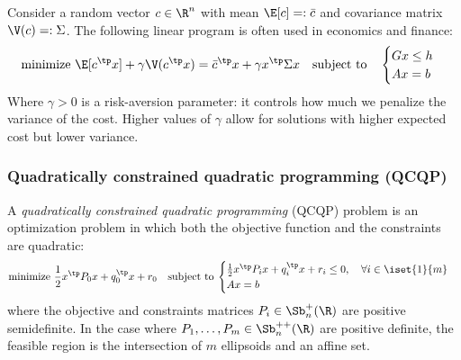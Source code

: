 \begin{example}
    Consider a random vector $c\in\R^n$ with mean $\E[c] =: \bar{c}$ and covariance matrix $\V(c) =: \Sigma$. The following linear program is often used in economics and finance:
    \begin{equation*}
        \text{minimize } \E[c^\tp x] + \gamma\V(c^\tp x) = \bar{c}^\tp x + \gamma x^\tp\Sigma x \quad\text{subject to}\quad \begin{cases}
            Gx\leq h\\
            Ax=b
        \end{cases}
    \end{equation*}
    Where $\gamma>0$ is a risk-aversion parameter: it controls how much we penalize the variance of the cost. Higher values of $\gamma$ allow for solutions with higher expected cost but lower variance.
\end{example}

\subsubsection{Quadratically constrained quadratic programming (QCQP)}
\begin{definition}
    A \emph{quadratically constrained quadratic programming} (QCQP) problem is an optimization problem in which both the objective function and the constraints are quadratic:
    \begin{equation*}
        \text{minimize } \frac{1}{2}x^\tp P_0 x + q_0^\tp x + r_0\quad\text{subject to}\: \begin{cases}
            \frac{1}{2}x^\tp P_i x + q_i^\tp x + r_i\leq0, \quad\forall i\in\iset{1}{m}\\
            Ax=b
        \end{cases}
    \end{equation*}
    where the objective and constraints matrices $P_i\in\Sb_n^+(\R)$ are positive semidefinite. In the case where $P_1, \dots, P_m\in\Sb_n^{++}(\R)$ are positive definite, the feasible region is the intersection of $m$ ellipsoids and an affine set.
\end{definition}

